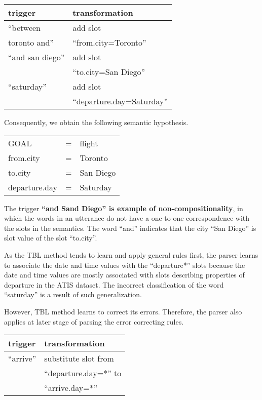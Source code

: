 \documentclass[11pt]{article}
\begin{document}
\vspace{.25cm}
\begin{tabular}{ll}
  trigger & transformation \\
  \hline 
  ``between               & add slot \\
    toronto and''         &``from.city=Toronto'' \\
  ``and san diego''       & add slot \\
                          & ``to.city=San Diego'' \\
  ``saturday''            & add slot \\
                          & ``departure.day=Saturday'' \\
\end{tabular} 
\vspace{.25cm}

Consequently, we obtain the following semantic hypothesis. 

\vspace{.25cm}
\begin{tabular}{lll}
  GOAL          & = & flight \\
  from.city     & = & Toronto \\
  to.city       & = & San Diego \\
  departure.day & = & Saturday \\
\end{tabular} 
\vspace{.25cm}

The trigger \textbf{``and Sand Diego'' is example of non-compositionality}, in which the words in an utterance do not have a one-to-one correspondence with the slots in the semantics. The word ``and'' indicates that the city ``San Diego'' is slot value of the slot ``to.city''. 

As the TBL method tends to learn and apply general rules first, the parser learns to associate the date and time values with the ``departure*'' slots because the date and time values are mostly associated with slots describing properties of departure in the ATIS dataset. The incorrect classification of the word ``saturday'' is a result of such generalization. 

However, TBL method learns to correct its errors. Therefore, the parser also applies at later stage of parsing the error correcting rules. 

\vspace{.25cm}
\begin{tabular}{ll}
  trigger & transformation \\
  \hline 
  ``arrive''            & substitute slot from\\
                        & ``departure.day=*'' to \\
                        & ``arrive.day=*'' \\
\end{tabular} 
\vspace{.25cm}
\end{document}

